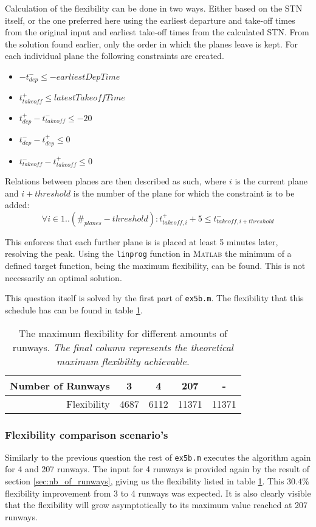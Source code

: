 \documentclass[10pt,a4paper]{article}
\begin{document}
Calculation of the flexibility can be done in two ways. Either based on the STN itself, or the one preferred here using the earliest departure and take-off times from the original input and earliest take-off times from the calculated STN. From the solution found earlier, only the order in which the planes leave is kept. For each individual plane the following constraints are created.
\begin{itemize}
\item $-t_{dep}^- \leq -earliestDepTime$
\item $t_{takeoff}^+ \leq latestTakeoffTime$
\item $t_{dep}^+ -t_{takeoff}^- \leq -20$  
\item $t_{dep}^- - t_{dep}^+ \leq 0$
\item $t_{takeoff}^- - t_{takeoff}^+ \leq 0$
\end{itemize}
Relations between planes are then described as such, where $i$ is the current plane and $i+threshold$ is the number of the plane for which the constraint is to be added:
\begin{equation}
\forall i \in 1..(\#_{planes}-threshold) : t_{takeoff,i}^+ + 5 \leq t_{takeoff,i+threshold}^-
\end{equation}

This enforces that each further plane is is placed at least 5 minutes later, resolving the peak. Using the \texttt{linprog} function in \textsc{Matlab} the minimum of a defined target function, being the maximum flexibility, can be found. This is not necessarily an optimal solution.

This question itself is solved by the first part of \texttt{ex5b.m}. The flexibility that this schedule has can be found in table \ref{table:flex}. 

\begin{table}
\centering
\begin{tabular}{ r || c | c | c | c}

Number of Runways & 3 & 4 & 207 & - \\ \hline
Flexibility & 4687 &  6112 & 11371 & 11371
\end{tabular}
\caption{The maximum flexibility for different amounts of runways. \emph{The final column represents the theoretical maximum flexibility achievable.}}
\label{table:flex}
\end{table}


\subsubsection{Flexibility comparison scenario's}
Similarly to the previous question the rest of \texttt{ex5b.m} executes the algorithm again for 4 and 207 runways. The input for 4 runways is provided again by the result of section \ref{sec:nb_of_runways}, giving us the flexibility listed in table \ref{table:flex}. This $30.4\%$ flexibility improvement from 3 to 4 runways was expected. It is also clearly visible that the flexibility will grow asymptotically to its maximum value reached at 207 runways.
\end{document}
